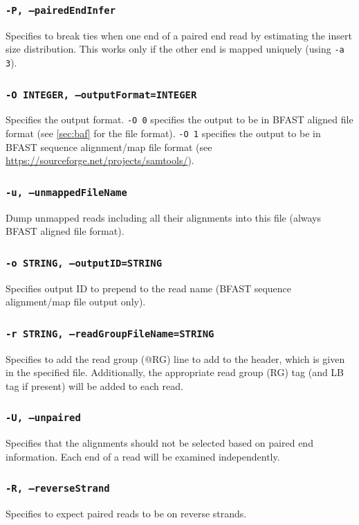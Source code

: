 \documentclass[a4paper,12pt]{book}
\newcommand{\TT}[1]{{\tt #1}} %
\newcommand{\BAF}{BFAST aligned file} %
\newcommand{\BSAMF}{BFAST sequence alignment/map file} %
\begin{document}
\subsubsection{\TT{-P, --pairedEndInfer}}
Specifies to break ties when one end of a paired end read by estimating the insert size distribution.  
This works only if the other end is mapped uniquely (using \TT{-a 3}).
\subsubsection{\TT{-O INTEGER, --outputFormat=INTEGER}}
Specifies the output format.
\TT{-O 0} specifies the output to be in \BAF{} format (see \autoref{sec:baf} for the file format).
\TT{-O 1} specifies the output to be in \BSAMF{} format (see \url{https://sourceforge.net/projects/samtools/}).

\subsubsection{\TT{-u, --unmappedFileName}}
Dump unmapped reads including all their alignments into this file (always \BAF{} format).
\subsubsection{\TT{-o STRING, --outputID=STRING}}
Specifies output ID to prepend to the read name (\BSAMF{} output only).
\subsubsection{\TT{-r STRING, --readGroupFileName=STRING}}
Specifies to add the read group (@RG) line to add to the header, which is given in the specified file.
Additionally, the appropriate read group (RG) tag (and LB tag if present) will be added to each read.
\subsubsection{\tt{-U, --unpaired}}
Specifies that the alignments should not be selected based on paired end information.
Each end of a read will be examined independently.

\subsubsection{\tt{-R, --reverseStrand}}
Specifies to expect paired reads to be on reverse strands.
\end{document}
